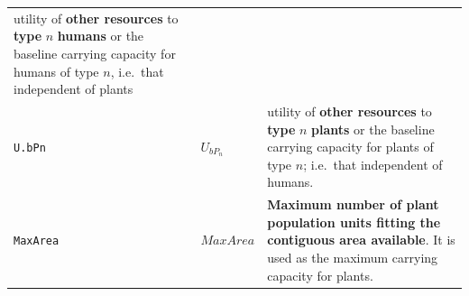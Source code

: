 \documentclass[
]{book}
\begin{document}
\begin{longtable}[]{@{}lll@{}}
\begin{minipage}[t]{0.40\columnwidth}
utility of \textbf{other resources} to \textbf{type} \(n\) \textbf{humans} or the baseline carrying capacity for humans of type \(n\), i.e.~that independent of plants\strut
\end{minipage}\tabularnewline
\begin{minipage}[t]{0.27\columnwidth}\raggedright
\texttt{U.bPn}\strut
\end{minipage} & \begin{minipage}[t]{0.25\columnwidth}\raggedright
\(U_{bP_{n}}\)\strut
\end{minipage} & \begin{minipage}[t]{0.40\columnwidth}\raggedright
utility of \textbf{other resources} to \textbf{type} \(n\) \textbf{plants} or the baseline carrying capacity for plants of type \(n\); i.e.~that independent of humans.\strut
\end{minipage}\tabularnewline
\begin{minipage}[t]{0.27\columnwidth}\raggedright
\texttt{MaxArea}\strut
\end{minipage} & \begin{minipage}[t]{0.25\columnwidth}\raggedright
\(MaxArea\)\strut
\end{minipage} & \begin{minipage}[t]{0.40\columnwidth}\raggedright
\textbf{Maximum number of plant population units fitting the contiguous area available}. It is used as the maximum carrying capacity for plants.\strut
\end{minipage}\tabularnewline
\bottomrule
\end{longtable}

\newpage
\end{document}
